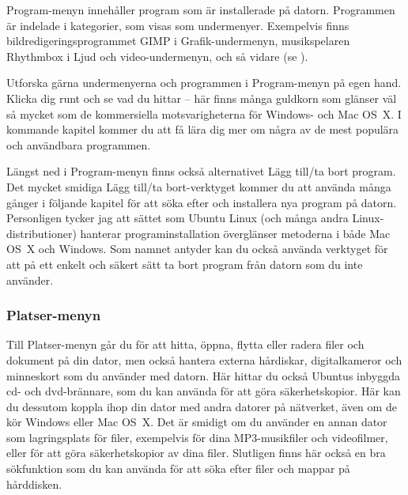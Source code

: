 \documentclass[a4paper,final]{memoir} %
\begin{document}
Program-menyn innehåller program som är installerade på datorn. Programmen är indelade i kategorier, som visas som undermenyer. Exempelvis finns bildredigeringsprogrammet GIMP i Grafik-undermenyn, musikspelaren Rhythmbox i Ljud och video-undermenyn, och så vidare (se ).


Utforska gärna undermenyerna och programmen i Program-menyn på egen hand. Klicka dig runt och se vad du hittar -- här finns många guldkorn som glänser väl så mycket som de kommersiella motsvarigheterna för Windows- och Mac OS~X. I kommande kapitel kommer du att få lära dig mer om några av de mest populära och användbara programmen.


Längst ned i Program-menyn finns också alternativet Lägg till/ta bort program. Det mycket smidiga Lägg till/ta bort-verktyget kommer du att använda många gånger i följande kapitel för att söka efter och installera nya program på datorn. Personligen tycker jag att sättet som Ubuntu Linux (och många andra Linux-distributioner) hanterar programinstallation överglänser metoderna i både Mac OS~X och Windows. Som namnet antyder kan du också använda verktyget för att på ett enkelt och säkert sätt ta bort program från datorn som du inte använder.



\subsubsection{Platser-menyn}


Till Platser-menyn går du för att hitta, öppna, flytta eller radera filer och dokument på din dator, men också hantera externa hårdiskar, digitalkameror och minneskort som du använder med datorn. Här hittar du också Ubuntus inbyggda cd- och dvd-brännare, som du kan använda för att göra säkerhetskopior. Här kan du dessutom koppla ihop din dator med andra datorer på nätverket, även om de kör Windows eller Mac OS~X. Det är smidigt om du använder en annan dator som lagringsplats för filer, exempelvis för dina MP3-musikfiler och videofilmer, eller för att göra säkerhetskopior av dina filer. Slutligen finns här också en bra sökfunktion som du kan använda för att söka efter filer och mappar på hårddisken.
\end{document}
